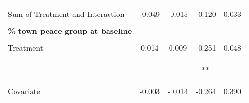 \begin{tabular}{lcccc}
 & \begin{footnotesize}[0.051]\end{footnotesize} & \begin{footnotesize}[0.024]\end{footnotesize} & \begin{footnotesize}[0.327]\end{footnotesize} & \begin{footnotesize}[0.270]\end{footnotesize}\\
\noalign{\smallskip}Sum of Treatment and Interaction & -0.049 & -0.013 & -0.120 & 0.033\\
 & \begin{footnotesize}[0.039]\end{footnotesize} & \begin{footnotesize}[0.019]\end{footnotesize} & \begin{footnotesize}[0.238]\end{footnotesize} & \begin{footnotesize}[0.191]\end{footnotesize}\\
\noalign{\smallskip}\textbf{\% town peace group at baseline} &  &  &  & \\
 & \begin{footnotesize}\end{footnotesize} & \begin{footnotesize}\end{footnotesize} & \begin{footnotesize}\end{footnotesize} & \begin{footnotesize}\end{footnotesize}\\
\noalign{\smallskip}Treatment & 0.014 & 0.009 & -0.251 & 0.048\\
 & \begin{footnotesize}[0.021]\end{footnotesize} & \begin{footnotesize}[0.009]\end{footnotesize} & \begin{footnotesize}[0.124]**\end{footnotesize} & \begin{footnotesize}[0.109]\end{footnotesize}\\
\noalign{\smallskip}Covariate & -0.003 & -0.014 & -0.264 & 0.390\\

\end{tabular}
